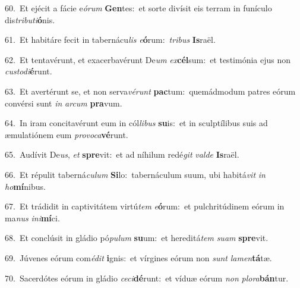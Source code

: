 {\numbfont\textcolor{\numbcolor}{60.}}~Et ejécit a fácie e\-\textit{ó}\-\textit{rum} \textbf{Gen}\-tes:~\star et sorte divísit eis terram in funículo dis\-\textit{tri}\-\textit{bu}\textit{ti}\textbf{ó}nis.\par
{\numbfont\textcolor{\numbcolor}{61.}}~Et habitáre fecit in tabernácu\textit{lis} \textit{e}\-\textbf{ó}rum:~\star \textit{tri}\-\textit{bus} \textbf{Is}\-raël.\par
{\numbfont\textcolor{\numbcolor}{62.}}~Et tentavérunt, et exacerbavérunt De\textit{um} \textit{ex}\-\textbf{cél}sum:~\star et testimónia ejus non \textit{cus}\-\textit{to}\textit{di}\textbf{é}runt.\par
{\numbfont\textcolor{\numbcolor}{63.}}~Et avertérunt se, et non serva\-\textit{vé}\-\textit{runt} \textbf{pac}\-tum:~\star quemádmodum patres eórum convérsi sunt \textit{in} \textit{ar}\-\textit{cum} \textbf{pra}\-vum.\par
{\numbfont\textcolor{\numbcolor}{64.}}~In iram concitavérunt eum in cól\-\textit{li}\-\textit{bus} \textbf{su}\-is:~\star et in sculptílibus suis ad æmulatiónem eum \textit{pro}\-\textit{vo}\textit{ca}\textbf{vé}runt.\par
{\numbfont\textcolor{\numbcolor}{65.}}~Audívit De\-\textit{us}\-, \textit{et} \textbf{spre}\-vit:~\star et ad níhilum redé\textit{git} \textit{val}\-\textit{de} \textbf{Is}\-raël.\par
{\numbfont\textcolor{\numbcolor}{66.}}~Et répulit taberná\-\textit{cu}\-\textit{lum} \textbf{Si}\-lo:~\star tabernáculum suum, ubi habitá\textit{vit} \textit{in} \textit{ho}\-\textbf{mí}nibus.\par
{\numbfont\textcolor{\numbcolor}{67.}}~Et trádidit in captivitátem virtú\textit{tem} \textit{e}\-\textbf{ó}rum:~\star et pulchritúdinem eórum in ma\textit{nus} \textit{in}\-\textit{i}\textbf{mí}ci.\par
{\numbfont\textcolor{\numbcolor}{68.}}~Et conclúsit in gládio pó\-\textit{pu}\-\textit{lum} \textbf{su}\-um:~\star et hereditá\textit{tem} \textit{su}\-\textit{am} \textbf{spre}\-vit.\par
{\numbfont\textcolor{\numbcolor}{69.}}~Júvenes eórum com\-\textit{é}\-\textit{dit} \textbf{i}\-gnis:~\star et vírgines eórum non \textit{sunt} \textit{la}\-\textit{men}\textbf{tá}tæ.\par
{\numbfont\textcolor{\numbcolor}{70.}}~Sacerdótes eórum in gládio \textit{ce}\-\textit{ci}\textbf{dé}runt:~\star et víduæ eórum \textit{non} \textit{plo}\-\textit{ra}\textbf{bán}tur.\par
